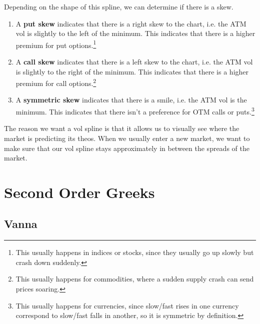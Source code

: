 \documentclass{article}
\begin{document}
    \begin{definition}[Skew]
      \label{def:skew}
      Depending on the shape of this spline, we can determine if there is a skew. 
      \begin{enumerate}
        \item A \textbf{put skew} indicates that there is a right skew to the chart, i.e. the ATM vol is slightly to the left of the minimum. This indicates that there is a higher premium for put options.\footnote{This usually happens in indices or stocks, since they usually go up slowly but crash down suddenly. }

        \item A \textbf{call skew} indicates that there is a left skew to the chart, i.e. the ATM vol is slightly to the right of the minimum. This indicates that there is a higher premium for call options.\footnote{This usually happens for commodities, where a sudden supply crash can send prices soaring. }

        \item A \textbf{symmetric skew} indicates that there is a smile, i.e. the ATM vol is the minimum. This indicates that there isn't a preference for OTM calls or puts.\footnote{This usually happens for currencies, since slow/fast rises in one currency correspond to slow/fast falls in another, so it is symmetric by definition. }
      \end{enumerate}
    \end{definition}

    The reason we want a vol spline is that it allows us to visually see where the market is predicting its theos. When we usually enter a new market, we want to make sure that our vol spline stays approximately in between the spreads of the market. 

\section{Second Order Greeks}

  \subsection{Vanna}
\end{document}
